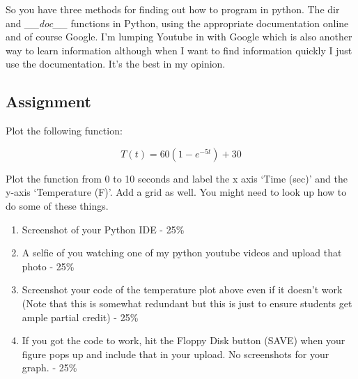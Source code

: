 So you have three methods for finding out how to program in
python. The dir and {\it \_\_doc\_\_} functions in Python, using the appropriate
documentation online and of course Google. I’m lumping Youtube in with
Google which is also another way to learn information although when I
want to find information quickly I just use the documentation. It’s
the best in my opinion. 

\subsection{Assignment}

Plot the following function: 

\begin{equation}
  T(t) = 60(1-e^{-5t})+30
\end{equation}

Plot the function from 0 to 10 seconds and label the x axis ‘Time
(sec)’ and the y-axis ‘Temperature (F)’. Add a grid as well. You might
need to look up how to do some of these things.



\begin{enumerate}[itemsep=-5pt]
  \item Screenshot of your Python IDE - 25\%
  \item A selfie of you watching one of my python youtube videos and upload that photo - 25\%
  \item Screenshot your code of the temperature plot above even if it doesn’t work (Note that this is somewhat redundant but this is just to ensure students get ample partial credit) - 25\%
  \item If you got the code to work, hit the Floppy Disk button (SAVE)
    when your figure pops up and include that in your upload. No screenshots for your graph. - 25\%
\end{enumerate}

